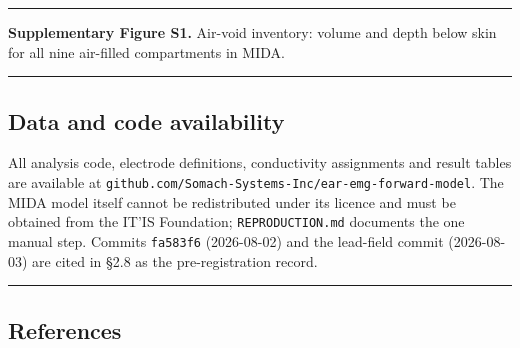 \documentclass[
  11pt,
  a4paper,
]{article}
\begin{document}
\begin{center}\rule{0.5\linewidth}{0.5pt}\end{center}

\textbf{Supplementary Figure S1.} Air-void inventory: volume and depth below skin for
all nine air-filled compartments in MIDA.

\begin{center}\rule{0.5\linewidth}{0.5pt}\end{center}

\FloatBarrier
\subsection{Data and code availability}\label{data-and-code-availability}

All analysis code, electrode definitions, conductivity assignments and result
tables are available at \texttt{github.com/Somach-Systems-Inc/ear-emg-forward-model}.
The MIDA model itself cannot be redistributed under its licence and must be
obtained from the IT'IS Foundation; \texttt{REPRODUCTION.md} documents the one manual
step. Commits \texttt{fa583f6} (2026-08-02) and the lead-field commit (2026-08-03) are
cited in \S{}2.8 as the pre-registration record.

\begin{center}\rule{0.5\linewidth}{0.5pt}\end{center}

\FloatBarrier
\subsection{References}\label{references}
\end{document}
